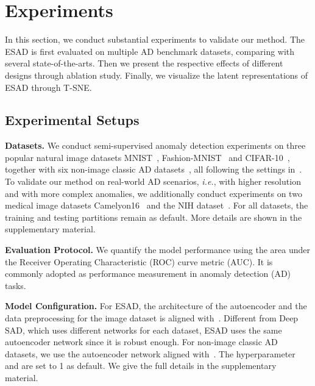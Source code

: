 \documentclass{bmvc2k}
\begin{document}
\section{Experiments}
In this section, we conduct substantial experiments to validate our method. The ESAD is first evaluated on multiple AD benchmark datasets, comparing with several state-of-the-arts. Then we present the respective effects of different designs through ablation study. Finally, we visualize the latent representations of ESAD through T-SNE.

\subsection{Experimental Setups}
\noindent\textbf{Datasets.}
We conduct semi-supervised anomaly detection experiments on three popular natural image datasets MNIST~\cite{lecun1998mnist}, Fashion-MNIST~\cite{xiao2017fashion} and CIFAR-10~\cite{krizhevsky2009learning}, together with six non-image classic AD datasets~\cite{Rayana2016}, all following the settings in~\cite{SAD}. 
To validate our method on real-world AD scenarios, \emph{i.e.}, with higher resolution and with more complex anomalies, we additionally conduct experiments on two medical image datasets Camelyon16~\cite{bejnordi2017diagnostic} and the NIH dataset~\cite{wang2017chestx}. For all datasets, the training and testing partitions remain as default. More details are shown in the supplementary material.

\noindent\textbf{Evaluation Protocol.} 
We quantify the model performance using the area under the Receiver Operating Characteristic (ROC) curve metric (AUC). It is commonly adopted as performance measurement in anomaly detection (AD) tasks.

\noindent\textbf{Model Configuration.}
For ESAD, the architecture of the autoencoder and the data preprocessing for the image dataset is aligned with~\cite{fye2020ARNet}. Different from Deep SAD, which uses different networks for each dataset, ESAD uses the same autoencoder network since it is robust enough. For non-image classic AD datasets, we use the autoencoder network aligned with~\cite{SAD}. The hyperparameter  and  are set to 1 as default. We give the full details in the supplementary material.
\end{document}
